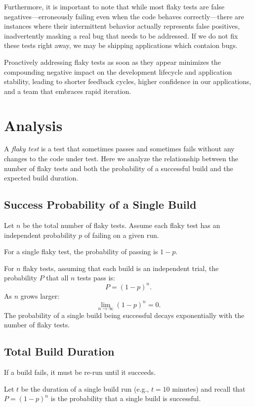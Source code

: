 \documentclass[letterpaper]{article}
\begin{document}
Furthermore, it is important to note that while most flaky tests are false negatives—erroneously failing even when the code behaves correctly—there are instances where their intermittent behavior actually represents false positives, inadvertently masking a real bug that needs to be addressed. If we do not fix these tests right away, we may be shipping applications which contaion bugs.

Proactively addressing flaky tests as soon as they appear minimizes the compounding negative impact on the development lifecycle and application stability, leading to shorter feedback cycles, higher confidence in our applications, and a team that embraces rapid iteration. 

\section{Analysis}

A \textit{flaky test} is a test that sometimes passes and sometimes fails without any changes to the code under test. Here we analyze the relationship between the number of flaky tests and both the probability of a successful build and the expected build duration.

\subsection{Success Probability of a Single Build}

\setlength{\parskip}{1em}

Let \( n \) be the total number of flaky tests. Assume each flaky test has an independent probability \( p \) of failing on a given run.

For a single flaky test, the probability of passing is \( 1 - p \).

For \( n \) flaky tests, assuming that each build is an independent trial, the probability \( P \) that all \( n \) tests pass is:
\[
P = (1 - p)^n.
\]
As \( n \) grows larger:
\[
\lim_{n \to \infty} (1 - p)^n = 0.
\]
The probability of a single build being successful decays exponentially with the number of flaky tests.

\subsection{Total Build Duration}

If a build fails, it must be re-run until it succeeds. 

Let \( t \) be the duration of a single build run (e.g., \( t = 10 \) minutes) and recall that \( P = (1 - p)^n \) is the probability that a single build is successful. 
\end{document}
